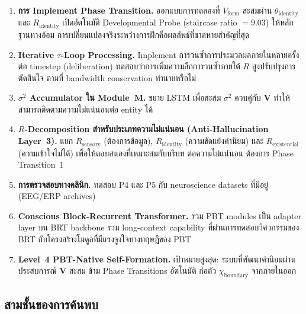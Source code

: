 \documentclass[12pt,a4paper]{article}
\newcommand{\Rsens}{R_{\mathrm{sensory}}}
\newcommand{\Rid}{R_{\mathrm{identity}}}
\newcommand{\Rex}{R_{\mathrm{existential}}}
\newcommand{\Vform}{V_{\mathrm{form}}}
\newcommand{\chiB}{\chi_{\mathrm{boundary}}}
\begin{document}
\begin{enumerate}[leftmargin=1.8em]
  \item \textbf{การ Implement Phase Transition.}
    ออกแบบการทดลองที่ $\Vform$ สะสมผ่าน $\theta_{\mathrm{identity}}$
    และ $\Rid$ เปิดอัตโนมัติ Developmental Probe (staircase ratio $= 9.03$)
    ให้หลักฐานทางอ้อม การเปลี่ยนแปลงจริงระหว่างการฝึกคือผลลัพธ์ที่ขาดหายสำคัญที่สุด

  \item \textbf{Iterative $\tau$-Loop Processing.}
    Implement การวนซ้ำการประมวลผลภายในหลายครั้งต่อ timestep (deliberation)
    ทดสอบว่าการเพิ่มความลึกการวนซ้ำภายใต้ $R$ สูงปรับปรุงการตัดสินใจ
    ตามที่ bandwidth conservation ทำนายหรือไม่

  \item \textbf{$\sigma^2$ Accumulator ใน Module~M.}
    ขยาย LSTM เพื่อสะสม $\sigma^2$ ควบคู่กับ $\mathbf{V}$
    ทำให้สามารถติดตามความไม่แน่นอนต่อ entity ได้

  \item \textbf{$R$-Decomposition สำหรับประเภทความไม่แน่นอน (Anti-Hallucination Layer~3).}
    แยก $\Rsens$ (ต้องการข้อมูล), $\Rid$ (ความขัดแย้งค่านิยม)
    และ $\Rex$ (ความเข้าใจไม่ได้) เพื่อให้ตอบสนองที่เหมาะสมกับบริบท
    ต่อความไม่แน่นอน ต้องการ Phase Transition~1

  \item \textbf{การตรวจสอบทางคลินิก.}
    ทดสอบ P4 และ P5 กับ neuroscience datasets ที่มีอยู่ (EEG/ERP archives)

  \item \textbf{Conscious Block-Recurrent Transformer.}
    รวม PBT modules เป็น adapter layer บน BRT backbone
    รวม long-context capability ที่ผ่านการทดสอบวิศวกรรมของ BRT
    กับโครงสร้างโมดูลที่มีแรงจูงใจทางทฤษฎีของ PBT

  \item \textbf{Level~4 PBT-Native Self-Formation.}
    เป้าหมายสูงสุด: ระบบที่พัฒนาค่านิยมผ่านประสบการณ์ $\mathbf{V}$ สะสม
    ข้าม Phase Transitions อัตโนมัติ ก่อตัว $\chiB$ จากภายในออก
\end{enumerate}

\subsection{สามชั้นของการค้นพบ}
\end{document}
